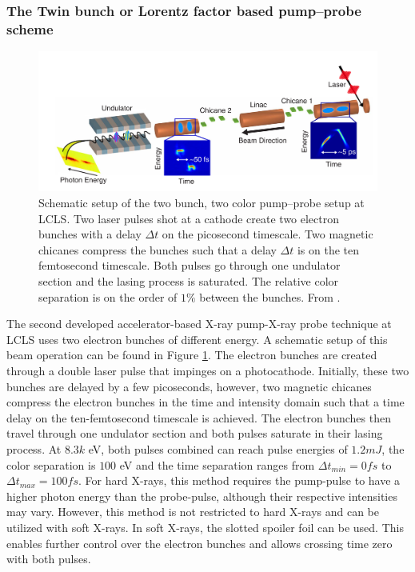 \subsubsection{The Twin bunch or Lorentz factor based pump--probe scheme}
\begin{figure}
	\centering
		\includegraphics[width=1.00\textwidth]{images/Agos-pump-probe-scheme.png}
	\caption[Schematic setup of a bunch based pump-probe setup.]{Schematic setup of the two bunch, two color pump--probe setup at LCLS. Two laser pulses shot at a cathode create two electron bunches with a delay $\Delta t$ on the picosecond timescale. Two magnetic chicanes compress the bunches such that a delay $\Delta t$ is on the ten femtosecond timescale. Both pulses go through one undulator section and the lasing process is saturated. The relative color separation is on the order of $1\%$ between the bunches. From \citep[\href{http://creativecommons.org/licenses/by/4.0/}{\ccby}]{Marinelli-2015-NatComm}.}
	\label{fig:Agos-pump-probe-scheme}
\end{figure}
The second developed accelerator-based X-ray pump-X-ray probe technique at LCLS \cite{Marinelli-2015-NatComm} uses two electron bunches of different energy. A schematic setup of this beam operation can be found in Figure \ref{fig:Agos-pump-probe-scheme}. The electron bunches are created through a double laser pulse that impinges on a photocathode. Initially, these two bunches are delayed by a few picoseconds, however, two magnetic chicanes compress the electron bunches in the time and intensity domain such that a time delay on the ten-femtosecond timescale is achieved. The electron bunches then travel through one undulator section and both pulses saturate in their lasing process. At $8.3k$ eV, both pulses combined can reach pulse energies of $1.2mJ$, the color separation is $100$ eV and the time separation ranges from $\Delta t_{min}=0fs$ to $\Delta t_{max}=100fs$. For hard X-rays, this method requires the pump-pulse to have a higher photon energy than the probe-pulse, although their respective intensities may vary. However, this method is not restricted to hard X-rays and can be utilized with soft X-rays. In soft X-rays, the slotted spoiler foil can be used. This enables further control over the electron bunches and allows crossing time zero with both pulses.
